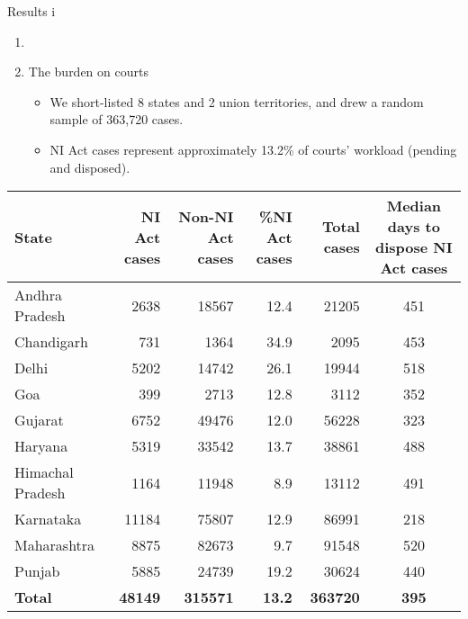 \documentclass[10pt,aspectratio=169]{beamer}
\begin{document}
\begin{frame}{Results i}
 \begin{enumerate}
 \item[]
 \item The burden on courts
 \begin{itemize}
 \item We short-listed 8 states and 2 union territories, and drew a random sample of 363,720 cases.
 \item NI Act cases represent approximately 13.2\% of courts' workload (pending and disposed).
 \end{itemize}
 \end{enumerate}

{\scriptsize \begin{longtable}{@{}lrrrr|c@{}}
\toprule
\textbf{State} & \multicolumn{1}{p{1.5cm}}{\textbf{NI Act cases}} & \multicolumn{1}{p{1.5cm}}{\textbf{Non-NI Act cases}} & \multicolumn{1}{p{1.5cm}}{\textbf{\%NI Act cases}} & \textbf{Total cases} & \multicolumn{1}{p{3cm}}{\textbf{Median days to dispose NI Act cases}}\\ \midrule
\endhead
Andhra Pradesh & 2638 & 18567 & 12.4 & 21205 & 451\\
Chandigarh & 731 & 1364 & 34.9 & 2095 & 453\\
Delhi & 5202 & 14742 & 26.1 & 19944 & 518\\
Goa & 399 & 2713 & 12.8 & 3112 & 352\\
Gujarat & 6752 & 49476 & 12.0 & 56228 & 323\\
Haryana & 5319 & 33542 & 13.7 & 38861 & 488\\
Himachal Pradesh & 1164 & 11948 & 8.9 & 13112 & 491\\
Karnataka & 11184 & 75807 & 12.9 & 86991 & 218\\
Maharashtra & 8875 & 82673 & 9.7 & 91548 & 520\\
Punjab & 5885 & 24739 & 19.2 & 30624 & 440\\
\midrule
\textbf{Total} & \textbf{48149} & \textbf{315571} & \textbf{13.2} & \textbf{363720} & \textbf{395}\\ \bottomrule
\end{longtable}
}
\end{frame}
\end{document}
